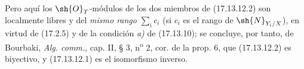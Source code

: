 
Pero aquí los $\sh{O}_T$-módulos de los dos miembros de (17.13.12.2) son localmente libres y del \emph{mismo rango} $\sum_i c_i$ (si $c_i$ es el rango de $\sh{N}_{Y_i/X}$), en virtud de (17.2.5) y de la condición \emph{a)} de (17.13.10); se concluye, por tanto, de Bourbaki, \emph{Alg. comm.}, cap. II, § 3, n\textsuperscript{o} 2, cor. de la prop. 6, que (17.13.12.2) es biyectivo, y (17.13.12.1) es el isomorfismo inverso.
